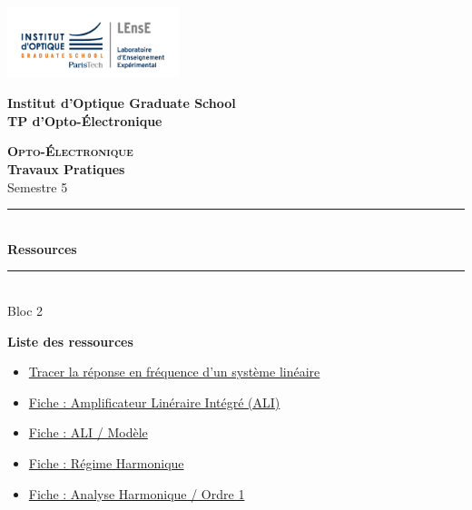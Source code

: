 \documentclass[a4paper,11pt]{article} %
\begin{document}
\newpage
\begin{center}
	\begin{minipage}{2.5cm}
	\begin{center}
		\includegraphics[width=5cm]{images/Logo-LEnsE.png}
	\end{center}
\end{minipage}\hfill
\begin{minipage}{10cm}
	\begin{center}
	\textbf{Institut d'Optique Graduate School }\\[0.1cm]
    \textbf{TP d'Opto-Électronique}


	\end{center}
\end{minipage}\hfill


\vspace{2cm}


{\Large \bfseries \textsc{Opto-Électronique}} \\[0.5cm]
{\large \bfseries Travaux Pratiques} \\[0.2cm]
Semestre 5

\vspace{1cm}

\rule{\linewidth}{0.3mm} \\[0.4cm]
{ \Large \bfseries\color{violet_iogs} Ressources \\[0.4cm] }
\rule{\linewidth}{0.3mm} \\[1cm]
{\large Bloc 2}

\end{center}

\vspace{3cm}

\textbf{\large Liste des ressources}
\begin{itemize}
	\item \hyperref[ressource:RepFreq]{Tracer la réponse en fréquence d'un système linéaire}
	\item \hyperref[fiche:ALI]{Fiche : Amplificateur Linéraire Intégré (ALI)}
	\item \hyperref[fiche:ALIModele]{Fiche : ALI / Modèle}
	\item \hyperref[fiche:RegimeHarmonique]{Fiche : Régime Harmonique}
	\item \hyperref[fiche:AnHaOrdre1]{Fiche : Analyse Harmonique / Ordre 1}
\end{itemize}
\end{document}
